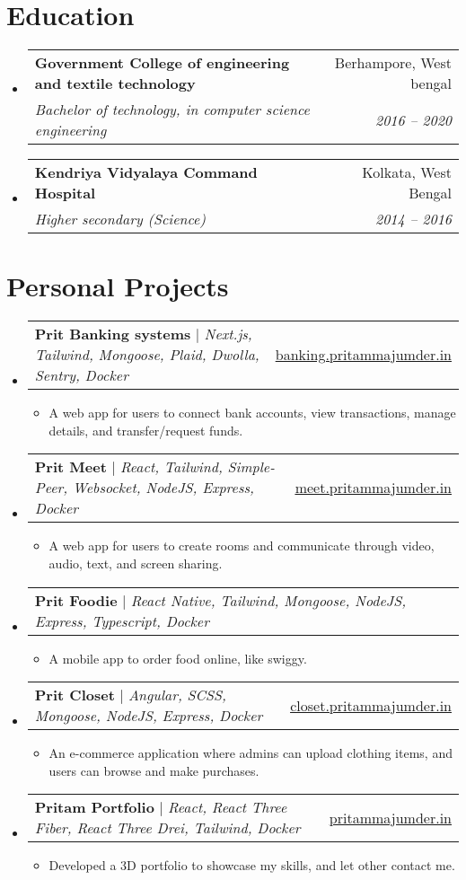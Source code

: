 \documentclass[letterpaper,10.5pt]{article}
\makeatletter
\newcommand{\resumeItem}[1]{
  \item\small{
    {#1 \vspace{-2pt}}
  }
}
\newcommand{\resumeSubheading}[4]{
  \vspace{-2pt}\item
    \begin{tabular*}{0.97\textwidth}[t]{l@{\extracolsep{\fill}}r}
      \textbf{#1} & #2 \\
      \textit{\small#3} & \textit{\small #4} \\
    \end{tabular*}\vspace{-7pt}
}
\newcommand{\resumeProjectHeading}[2]{
    \item
    \begin{tabular*}{0.97\textwidth}{l@{\extracolsep{\fill}}r}
      \small#1 & #2 \\
    \end{tabular*}\vspace{-7pt}
}
\newcommand{\resumeSubHeadingListStart}{\begin{itemize}[leftmargin=0.15in, label={}]}
\newcommand{\resumeSubHeadingListEnd}{\end{itemize}}
\newcommand{\resumeItemListStart}{\begin{itemize}}
\newcommand{\resumeItemListEnd}{\end{itemize}\vspace{-5pt}}
\makeatother
\begin{document}
\section{Education}
  \resumeSubHeadingListStart
    \resumeSubheading
      {Government College of engineering and textile technology}{Berhampore, West bengal}
      {Bachelor of technology, in computer science engineering}{2016 -- 2020}
    \resumeSubheading
      {Kendriya Vidyalaya Command Hospital}{Kolkata, West Bengal}
      {Higher secondary (Science)}{2014 -- 2016}
  \resumeSubHeadingListEnd
\section{Personal Projects}
    \resumeSubHeadingListStart
      \resumeProjectHeading
          {\textbf{Prit Banking systems} $|$ \emph{Next.js, Tailwind, Mongoose, Plaid, Dwolla, Sentry, Docker}}{\href{https://banking.pritammajumder.in}{\underline{banking.pritammajumder.in}}}
          \resumeItemListStart
            \resumeItem{A web app for users to connect bank accounts, view transactions, manage details, and transfer/request funds.}
          \resumeItemListEnd
      \resumeProjectHeading
          {\textbf{Prit Meet} $|$ \emph{React, Tailwind, Simple-Peer, Websocket, NodeJS, Express, Docker}}{\href{https://meet.pritammajumder.in}{\underline{meet.pritammajumder.in}}}
          \resumeItemListStart
            \resumeItem{A web app for users to create rooms and communicate through video, audio, text, and screen sharing.}
          \resumeItemListEnd
           \resumeProjectHeading
          {\textbf{Prit Foodie} $|$ \emph{React Native, Tailwind, Mongoose, NodeJS, Express, Typescript, Docker}}{}
          \resumeItemListStart
            \resumeItem{A mobile app to order food online, like swiggy.}
          \resumeItemListEnd
          \resumeProjectHeading
          {\textbf{Prit Closet} $|$ \emph{Angular, SCSS, Mongoose, NodeJS, Express, Docker}}{\href{https://closet.pritammajumder.in}{\underline{closet.pritammajumder.in}}}
          \resumeItemListStart
            \resumeItem{An e-commerce application where admins can upload clothing items, and users can browse and make purchases.}
          \resumeItemListEnd
          \resumeProjectHeading
          {\textbf{Pritam Portfolio} $|$ \emph{React, React Three Fiber, React Three Drei, Tailwind, Docker}}{\href{https://pritammajumder.in}{\underline{pritammajumder.in}}}
          \resumeItemListStart
            \resumeItem{Developed a 3D portfolio to showcase my skills, and let other contact me.}
          \resumeItemListEnd
    \resumeSubHeadingListEnd
\end{document}
